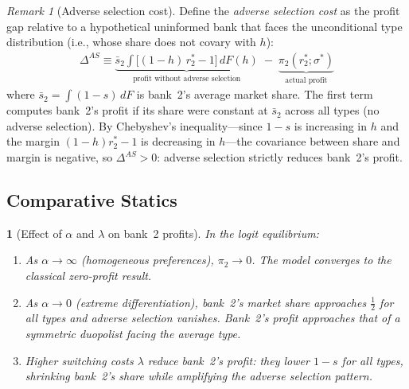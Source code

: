 \documentclass[12pt]{article}
\theoremstyle{plain}
\theoremstyle{plain}
\newtheorem{prop}[thm]{\protect\propositionname}
\theoremstyle{definition}  %
\theoremstyle{remark}  %
\newtheorem{remark}[thm]{Remark}  %
\providecommand{\propositionname}{Proposition}
\begin{document}
\begin{remark}[Adverse selection cost]\label{rem:as_cost}
Define the \emph{adverse selection cost} as the profit gap relative to a hypothetical uninformed bank that faces the unconditional type distribution (i.e., whose share does not covary with $h$):
\begin{align}\label{eq:AS_cost}
    \Delta^{AS} \equiv \underbrace{\bar{s}_2 \int \big[(1-h)\,r_2^* - 1\big]\, dF(h)}_{\text{profit without adverse selection}} \;-\; \underbrace{\pi_2(r_2^*;\sigma^*)}_{\text{actual profit}}
\end{align}
where $\bar{s}_2 = \int (1-s)\, dF$ is bank~2's average market share. The first term computes bank~2's profit if its share were constant at $\bar{s}_2$ across all types (no adverse selection). By Chebyshev's inequality---since $1-s$ is increasing in $h$ and the margin $(1-h)r_2^* - 1$ is decreasing in $h$---the covariance between share and margin is negative, so $\Delta^{AS} > 0$: adverse selection strictly reduces bank~2's profit.
\end{remark}

\subsection{Comparative Statics}

\begin{prop}[Effect of $\alpha$ and $\lambda$ on bank~2 profits]\label{prop:b2compstat}
In the logit equilibrium:
\begin{enumerate}
    \item As $\alpha \to \infty$ (homogeneous preferences), $\pi_2 \to 0$. The model converges to the classical zero-profit result.
    \item As $\alpha \to 0$ (extreme differentiation), bank~2's market share approaches $\frac{1}{2}$ for all types and adverse selection vanishes. Bank~2's profit approaches that of a symmetric duopolist facing the average type.
    \item Higher switching costs $\lambda$ reduce bank~2's profit: they lower $1-s$ for all types, shrinking bank~2's share while amplifying the adverse selection pattern.
\end{enumerate}
\end{prop}
\end{document}
